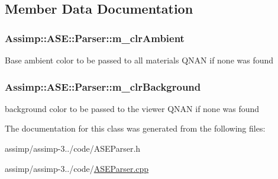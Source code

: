 \subsection{Member Data Documentation}
\hypertarget{class_assimp_1_1_a_s_e_1_1_parser_a4558b782fb5c7d6b0d71d2c6ccbb490f}{
\subsubsection[{m\+\_\+clr\+Ambient}]{ Assimp\+::\+A\+S\+E\+::\+Parser\+::m\+\_\+clr\+Ambient}}\label{class_assimp_1_1_a_s_e_1_1_parser_a4558b782fb5c7d6b0d71d2c6ccbb490f}
Base ambient color to be passed to all materials Q\+N\+A\+N if none was found \hypertarget{class_assimp_1_1_a_s_e_1_1_parser_a81bdd11dad2105b412e057e60c7164d0}{
\subsubsection[{m\+\_\+clr\+Background}]{ Assimp\+::\+A\+S\+E\+::\+Parser\+::m\+\_\+clr\+Background}}\label{class_assimp_1_1_a_s_e_1_1_parser_a81bdd11dad2105b412e057e60c7164d0}
background color to be passed to the viewer Q\+N\+A\+N if none was found 

The documentation for this class was generated from the following files\+:\begin{DoxyCompactItemize}
\item 
assimp/assimp-\/3../code/A\+S\+E\+Parser.\+h\item 
assimp/assimp-\/3../code/\hyperlink{_a_s_e_parser_8cpp}{A\+S\+E\+Parser.\+cpp}\end{DoxyCompactItemize}
